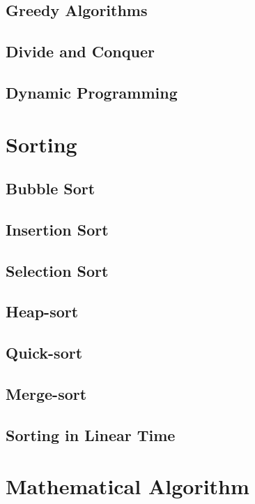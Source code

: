 		\section{Greedy Algorithms}

		\section{Divide and Conquer}

		\section{Dynamic Programming}

	\chapter{Sorting}
		\section{Bubble Sort}

		\section{Insertion Sort}

		\section{Selection Sort}

		\section{Heap-sort}

		\section{Quick-sort}

		\section{Merge-sort}

		\section{Sorting in Linear Time}

	\chapter{Mathematical Algorithm}
